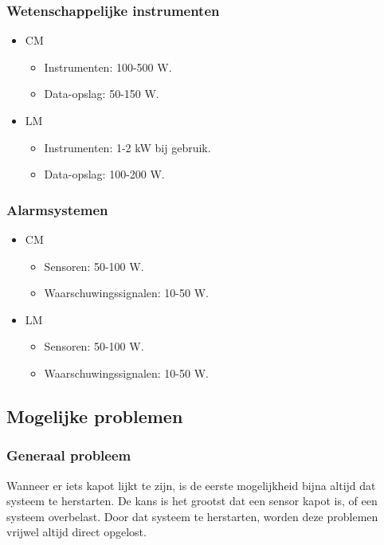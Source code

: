 \subsubsection{Wetenschappelijke instrumenten}
\begin{itemize}
    \item CM
    \begin{itemize}
        \item Instrumenten: 100-500 W.
        \item Data-opslag: 50-150 W.
    \end{itemize}
    \item LM
    \begin{itemize}
        \item Instrumenten: 1-2 kW bij gebruik.
        \item Data-opslag: 100-200 W.
    \end{itemize}
\end{itemize}

\subsubsection{Alarmsystemen}
\begin{itemize}
    \item CM
    \begin{itemize}
        \item Sensoren: 50-100 W.
        \item Waarschuwingssignalen: 10-50 W.
    \end{itemize}
    \item LM
    \begin{itemize}
        \item Sensoren: 50-100 W.
        \item Waarschuwingssignalen: 10-50 W.
    \end{itemize}
\end{itemize}


\subsection{Mogelijke problemen}

\subsubsection{Generaal probleem}
Wanneer er iets kapot lijkt te zijn, is de eerste mogelijkheid bijna altijd dat systeem te herstarten. De kans is het grootst dat een sensor kapot is, of een systeem overbelast. Door dat systeem te herstarten, worden deze problemen vrijwel altijd direct opgelost.

